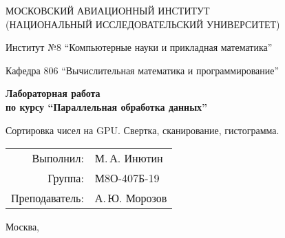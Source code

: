 \begin{titlepage}
\begin{center}
\large
МОСКОВСКИЙ АВИАЦИОННЫЙ ИНСТИТУТ\\ (НАЦИОНАЛЬНЫЙ ИССЛЕДОВАТЕЛЬСКИЙ УНИВЕРСИТЕТ)

\vspace{20pt}

Институт №8 \enquote{Компьютерные науки и прикладная математика}

Кафедра 806 \enquote{Вычислительная математика и программирование}
\end{center}

\vspace{60pt}

\begin{center}
\bfseries
\large
Лабораторная работа  \\по курсу \enquote{Параллельная обработка данных}

\vspace{54pt}

Сортировка чисел на GPU. Свертка, сканирование, гистограмма.
\end{center}

\vfill

\begin{flushright}
\large
\begin{tabular}{rl}
Выполнил: & М.\,А. Инютин \\
Группа: & М8О-407Б-19 \\
Преподаватель: & А.\,Ю. Морозов \\
\end{tabular}
\end{flushright}

\vspace{92pt}

\begin{center}
\large
Москва, \the\year
\end{center}
\end{titlepage}

\pagebreak
